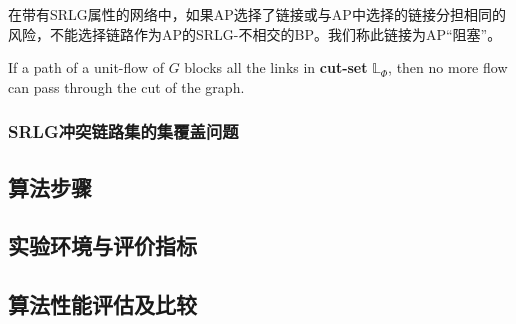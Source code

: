 在带有SRLG属性的网络中，如果AP选择了链接或与AP中选择的链接分担相同的风险，不能选择链路作为AP的SRLG-不相交的BP。我们称此链接为AP“阻塞”。

\begin{theorem}
    If a path of a unit-flow of $G$ blocks all the links in \textbf{cut-set} $\mathbb{L}_{\Phi}$, then no more flow can pass through the cut of the graph.
\label{th:block flow}
\end{theorem}


\subsubsection{SRLG冲突链路集的集覆盖问题}

\subsection{算法步骤}
\subsection{实验环境与评价指标}
\subsection{算法性能评估及比较}
